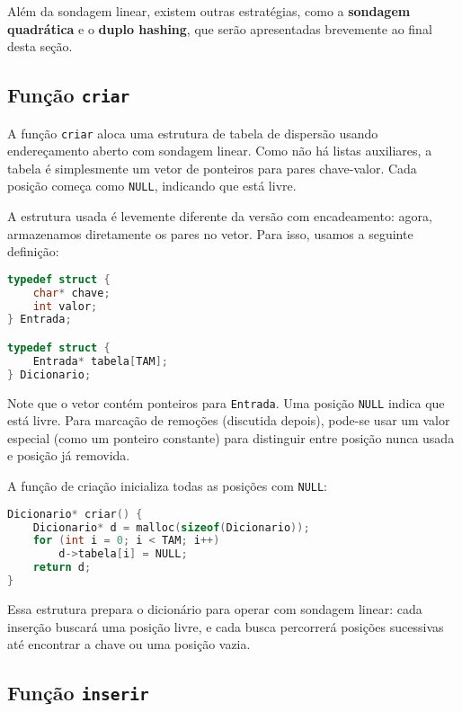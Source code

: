 Além da sondagem linear, existem outras estratégias, como a \textbf{sondagem quadrática} e o \textbf{duplo hashing}, que serão apresentadas brevemente ao final desta seção.

\subsection*{Função \texttt{criar}}

A função \texttt{criar} aloca uma estrutura de tabela de dispersão usando endereçamento aberto com sondagem linear. 
Como não há listas auxiliares, a tabela é simplesmente um vetor de ponteiros para pares chave-valor. 
Cada posição começa como \texttt{NULL}, indicando que está livre.

A estrutura usada é levemente diferente da versão com encadeamento: agora, armazenamos diretamente os pares no vetor. Para isso, usamos a seguinte definição:

\begin{lstlisting}[language=C, caption={Estrutura do par chave-valor com marcador de ocupação}]
typedef struct {
    char* chave;
    int valor;
} Entrada;

typedef struct {
    Entrada* tabela[TAM];
} Dicionario;
\end{lstlisting}

Note que o vetor contém ponteiros para \texttt{Entrada}. 
Uma posição \texttt{NULL} indica que está livre. Para marcação de remoções (discutida depois), pode-se usar um valor especial (como um ponteiro constante) para distinguir entre posição nunca usada e posição já removida.

A função de criação inicializa todas as posições com \texttt{NULL}:

\begin{lstlisting}[language=C, caption={Criação de tabela com sondagem linear}]
Dicionario* criar() {
    Dicionario* d = malloc(sizeof(Dicionario));
    for (int i = 0; i < TAM; i++)
        d->tabela[i] = NULL;
    return d;
}
\end{lstlisting}

Essa estrutura prepara o dicionário para operar com sondagem linear: cada inserção buscará uma posição livre, e cada busca percorrerá posições sucessivas até encontrar a chave ou uma posição vazia.

\subsection*{Função \texttt{inserir}}

